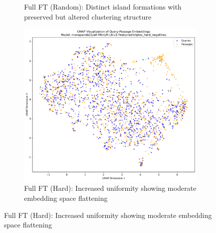 \documentclass[conference]{IEEEtran}
\begin{document}
\begin{figure}[t]
\begin{subfigure}{0.32\textwidth}
\caption{Full FT (Random): Distinct island formations with preserved but altered clustering structure}
\label{fig:umap_full_random}
\end{subfigure}
\hfill
\begin{subfigure}{0.32\textwidth}
\includegraphics[width=\textwidth]{umap_visualization_manupande21_all_MiniLM_L6_v2_finetuned_triples_hard_negatives.png}
\caption{Full FT (Hard): Increased uniformity showing moderate embedding space flattening}
\label{fig:umap_full_hard}
\end{subfigure}

\vspace{0.5cm}


\end{figure}
\end{document}

